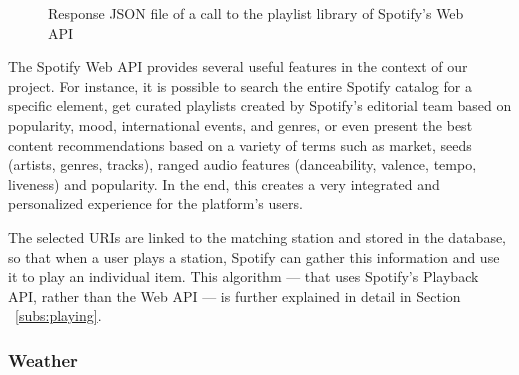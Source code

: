 \begin{figure}[h]
\centering
{}
\caption{Response JSON file of a call to the playlist library of Spotify's Web API}
\label{fig:mys}
\end{figure}


The Spotify Web \ac{API} provides several useful features in the context of our project. For instance, it is possible to search the entire Spotify catalog for a specific element, get curated playlists created by Spotify’s editorial team based on popularity, mood, international events, and genres, or even present the best content recommendations based on a variety of terms such as market, seeds (artists, genres, tracks), ranged audio features (danceability, valence, tempo, liveness) and popularity. In the end, this creates a very integrated and personalized experience for the platform's users.

The selected \acp{URI} are linked to the matching station and stored in the database, so that when a user plays a station, Spotify can gather this information and use it to play an individual item. This algorithm — that uses Spotify's Playback \ac{API}, rather than the Web \ac{API} — is further explained in detail in Section ~\ref{subs:playing}.
\newpage

\subsubsection{Weather}

